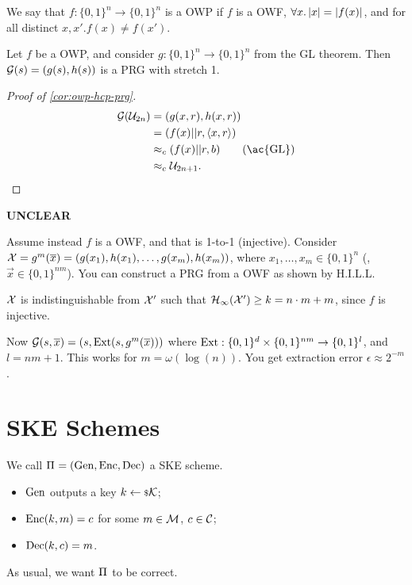 \begin{definition}
	We say that $f : \{0,1\}^n \to \{0,1\}^{n}$ is a \ac{OWP} if $f$ is a \ac{OWF}, $\forall x . \left|{x}\right| = \left|{f(x)}\right|$, and for all distinct $x, x' . f(x) \neq f(x')$.
\end{definition}

\begin{corollary} \label{cor:owp-hcp-prg}
	Let $f$ be a \ac{OWP}, and consider $g : \{0,1\}^n \to \{0,1\}^{n}$ from the \ac{GL} theorem.
	Then $\mathcal{G}(s) = (g(s), h(s))$ is a \ac{PRG} with stretch 1.
\end{corollary}

\begin{proof}[Proof of \cref{cor:owp-hcp-prg}]
	\begin{align*}
		\G(\U_{2n})
		& =
		(g(x,r), h(x,r)) \\
		& =
		(f(x) || r, \DotProduct{x}{r}) \\
		& \CompInd 
		(f(x) || r, b) \tag{\ac{GL}}
		\\
		& \CompInd
		\U_{2n+1}.
	\end{align*}
\end{proof}


\begin{framed}
{\bfseries UNCLEAR}

Assume instead $f$ is a \ac{OWF}, and that is 1-to-1 (injective).
Consider $\mathcal{X} = g^m(\overline{x}) = (g(x_1), h(x_1), \dots, g(x_m), h(x_m))$, where $x_1, \dots, x_m \in \{0,1\}^{n}$ (\ie, $\vec{x} \in \{0,1\}^{nm}$).
You can construct a \ac{PRG} from a \ac{OWF} as shown by H.I.L.L.

\begin{fact}
$\mathcal{X}$ is indistinguishable from $\mathcal{X}'$ such that $\mathcal{H}_{\infty}(\mathcal{X}') \ge k = n \cdot m + m$, since $f$ is injective.
\end{fact}

Now $\mathcal{G}(s, \overline{x}) = (s, \mathrm{Ext}(s, g^{m}(\overline{x})))$ where $\mathrm{Ext} : \{0,1\}^{d} \times \{0,1\}^{nm} \to \{0,1\}^{l}$, and $l = nm + 1$.
This works for $m = \omega(\log(n))$.
You get extraction error $\epsilon \approx 2^{-m}$.
\end{framed}

\section{\acl{SKE} Schemes}

We call $\Pi_{} = \left( \mathrm{Gen} , \allowbreak \mathrm{Enc} , \allowbreak \mathrm{Dec} \right)$ a \ac{SKE} scheme.
\begin{itemize}
	\item $\mathrm{Gen}$ outputs a key $k \leftarrow {\scriptstyle \$} {\mathcal{K}}$;
	\item $\mathrm{Enc}(k, m) = c$ for some $m \in \mathcal{M}$, $c \in \mathcal{C}$;
	\item $\mathrm{Dec}(k, c) = m$.
\end{itemize}
As usual, we want $\Pi_{}$ to be correct.

